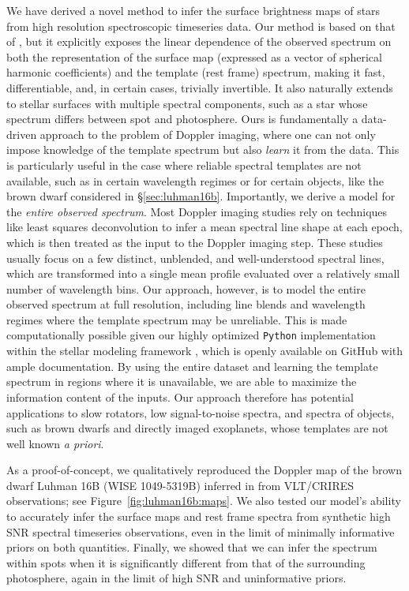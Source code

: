 \documentclass[modern]{aastex631}
\begin{document}
We have derived a novel method to infer the surface brightness maps of stars from high resolution spectroscopic timeseries data.
Our method is based on that of \citet{Vogt1987}, but it explicitly exposes the linear dependence of the observed spectrum on both the representation of the surface map (expressed as a vector of spherical harmonic coefficients) and the template (rest frame) spectrum, making it fast, differentiable, and, in certain cases, trivially invertible.
It also naturally extends to stellar surfaces with multiple spectral components, such as a star whose spectrum differs between spot and photosphere.
Ours is fundamentally a data-driven approach to the problem of Doppler imaging, where one can not only impose knowledge of the template spectrum but also \emph{learn} it from the data.
This is particularly useful in the case where reliable spectral templates are not available, such as in certain wavelength regimes or for certain objects, like the brown dwarf considered in \S\ref{sec:luhman16b}.
Importantly, we derive a model for the \emph{entire observed spectrum}.
Most Doppler imaging studies rely on techniques like least squares deconvolution \citep[LSD;][]{Donati1997} to infer a mean spectral line shape at each epoch, which is then treated as the input to the Doppler imaging step.
These studies usually focus on a few distinct, unblended, and well-understood spectral lines, which are transformed into a single mean profile evaluated over a relatively small number of wavelength bins.
Our approach, however, is to model the entire observed spectrum at full resolution, including line blends and wavelength regimes where the template spectrum may be unreliable.
This is made computationally possible given our highly optimized \texttt{Python} implementation within the \starry stellar modeling framework \citep{Luger2019}, which is openly available on GitHub with ample documentation.
By using the entire dataset and learning the template spectrum in regions where it is unavailable, we are able to maximize the information content of the inputs.
Our approach therefore has potential applications to slow rotators, low signal-to-noise spectra, and spectra of objects, such as brown dwarfs and directly imaged exoplanets, whose templates are not well known \emph{a priori}.

As a proof-of-concept, we qualitatively reproduced the Doppler map of the brown dwarf Luhman 16B (WISE 1049-5319B) inferred in \citet{Crossfield2014} from VLT/CRIRES observations; see Figure~\ref{fig:luhman16b:maps}.
We also tested our model's ability to accurately infer the surface maps and rest frame spectra from synthetic high SNR spectral timeseries observations, even in the limit of minimally informative priors on both quantities. 
Finally, we showed that we can infer the spectrum within spots when it is significantly different from that of the surrounding photosphere, again in the limit of high SNR and uninformative priors.
\end{document}
